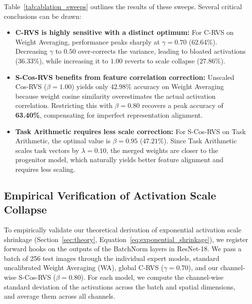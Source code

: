 \documentclass{article}
\theoremstyle{plain}
\theoremstyle{definition}
\theoremstyle{remark}
\begin{document}
Table~\ref{tab:ablation_sweeps} outlines the results of these sweeps. Several critical conclusions can be drawn:
\begin{itemize}\sloppy
    \item \textbf{C-RVS is highly sensitive with a distinct optimum:} For C-RVS on Weight Averaging, performance peaks sharply at $\gamma=0.70$ (62.64\%). Decreasing $\gamma$ to $0.50$ over-corrects the variance, leading to bloated activations ($36.33\%$), while increasing it to $1.00$ reverts to scale collapse ($27.86\%$).
    \item \textbf{S-Cos-RVS benefits from feature correlation correction:} Unscaled Cos-RVS ($\beta=1.00$) yields only $42.98\%$ accuracy on Weight Averaging because weight cosine similarity overestimates the actual activation correlation. Restricting this with $\beta=0.80$ recovers a peak accuracy of \textbf{63.40\%}, compensating for imperfect representation alignment.
    \item \textbf{Task Arithmetic requires less scale correction:} For S-Cos-RVS on Task Arithmetic, the optimal value is $\beta=0.95$ ($47.21\%$). Since Task Arithmetic scales task vectors by $\lambda=0.10$, the merged weights are closer to the progenitor model, which naturally yields better feature alignment and requires less scaling.
\end{itemize}

\subsection{Empirical Verification of Activation Scale Collapse}
\label{sec:act_scale}

To empirically validate our theoretical derivation of exponential activation scale shrinkage (Section~\ref{sec:theory}, Equation~\ref{eq:exponential_shrinkage}), we register forward hooks on the outputs of the BatchNorm layers in ResNet-18. We pass a batch of 256 test images through the individual expert models, standard uncalibrated Weight Averaging (WA), global C-RVS ($\gamma=0.70$), and our channel-wise S-Cos-RVS ($\beta=0.80$). For each model, we compute the channel-wise standard deviation of the activations across the batch and spatial dimensions, and average them across all channels.
\end{document}
